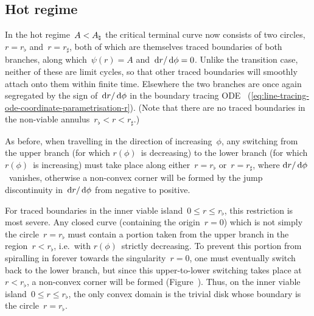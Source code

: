 \subsection{Hot regime}
\label{sec:polar.tracing.hot}

In the hot regime~$A < A_\natural$
the critical terminal curve now consists of two circles,
$r = r_\flat$ and~$r = r_\sharp$,
both of which are themselves traced boundaries of both branches,
along which~$\psi (r) = A$ and~$\mathop{}\!\mathrm{d} r / \mathop{}\!\mathrm{d}\phi = 0$.
Unlike the transition case,
neither of these are limit cycles,
so that other traced boundaries will smoothly attach onto them
within finite time.
Elsewhere the two branches are once again segregated
by the sign of~$\mathop{}\!\mathrm{d} r / \mathop{}\!\mathrm{d}\phi$ in the boundary tracing ODE~%
  (\ref{eq:line-tracing-ode-coordinate-parametrisation-r}).
(Note that there are no traced boundaries
in the non-viable annulus~$r_\flat < r < r_\sharp$.)

As before, when travelling in the direction of increasing~$\phi$,
any switching from the upper branch (for which $r (\phi)$~is decreasing)
to the lower branch (for which $r (\phi)$~is increasing)
must take place along either~$r = r_\flat$ or~$r = r_\sharp$,
where $\mathop{}\!\mathrm{d} r / \mathop{}\!\mathrm{d}\phi$~vanishes,
otherwise a non-convex corner will be formed
by the jump discontinuity in~$\mathop{}\!\mathrm{d} r / \mathop{}\!\mathrm{d}\phi$
from negative to positive.

For traced boundaries in the inner viable island~$0 \le r \le r_\flat$,
this restriction is most severe.
Any closed curve (containing the origin~$r = 0$)
which is not simply the circle~$r = r_\flat$
must contain a portion taken from the upper branch
in the region~$r < r_\flat$,
i.e.~with $r (\phi)$~strictly decreasing.
To prevent this portion from spiralling in forever
towards the singularity~$r = 0$,
one must eventually switch back to the lower branch,
but since this upper-to-lower switching takes place at~$r < r_\flat$,
a non-convex corner will be formed
(Figure~\tbd).
Thus, on the inner viable island~$0 \le r \le r_\flat$,
the only convex domain is the trivial disk
whose boundary is the circle~$r = r_\flat$.

